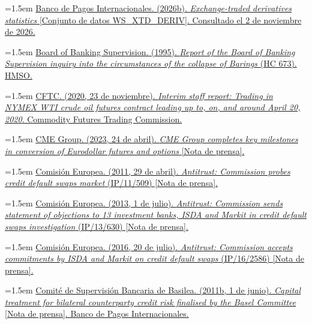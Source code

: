 \documentclass[10pt,a4paper]{article}
\begin{document}
\noindent\hangindent=1.5em \href{https://data.bis.org/static/bulk/WS_XTD_DERIV_csv_flat.zip}{Banco de Pagos Internacionales. (2026b). \textit{Exchange-traded derivatives statistics} [Conjunto de datos WS\_XTD\_DERIV]. Consultado el 2 de noviembre de 2026.}

\noindent\hangindent=1.5em \href{https://assets.publishing.service.gov.uk/media/5a7ca783ed915d6969f46688/0673.pdf}{Board of Banking Supervision. (1995). \textit{Report of the Board of Banking Supervision inquiry into the circumstances of the collapse of Barings} (HC 673). HMSO.}

\noindent\hangindent=1.5em \href{https://www.cftc.gov/media/5296/InterimStaffReportNYMEX_WTICrudeOil/download}{CFTC. (2020, 23 de noviembre). \textit{Interim staff report: Trading in NYMEX WTI crude oil futures contract leading up to, on, and around April 20, 2020}. Commodity Futures Trading Commission.}

\noindent\hangindent=1.5em \href{https://www.cmegroup.com/media-room/press-releases/2023/4/24/cme_group_completeskeymilestonesinconversionofeurodollarfutureso.html}{CME Group. (2023, 24 de abril). \textit{CME Group completes key milestones in conversion of Eurodollar futures and options} [Nota de prensa].}

\noindent\hangindent=1.5em \href{https://ec.europa.eu/commission/presscorner/detail/en/IP_11_509}{Comisión Europea. (2011, 29 de abril). \textit{Antitrust: Commission probes credit default swaps market} (IP/11/509) [Nota de prensa].}

\noindent\hangindent=1.5em \href{https://ec.europa.eu/commission/presscorner/detail/en/IP_13_630}{Comisión Europea. (2013, 1 de julio). \textit{Antitrust: Commission sends statement of objections to 13 investment banks, ISDA and Markit in credit default swaps investigation} (IP/13/630) [Nota de prensa].}

\noindent\hangindent=1.5em \href{https://ec.europa.eu/commission/presscorner/detail/en/IP_16_2586}{Comisión Europea. (2016, 20 de julio). \textit{Antitrust: Commission accepts commitments by ISDA and Markit on credit default swaps} (IP/16/2586) [Nota de prensa].}

\noindent\hangindent=1.5em \href{https://www.bis.org/press/p110601.htm}{Comité de Supervisión Bancaria de Basilea. (2011b, 1 de junio). \textit{Capital treatment for bilateral counterparty credit risk finalised by the Basel Committee} [Nota de prensa]. Banco de Pagos Internacionales.}
\end{document}
